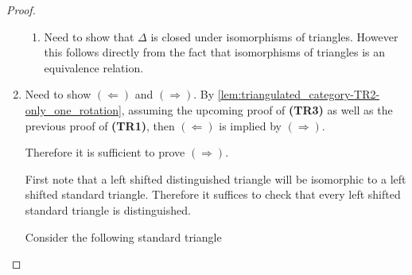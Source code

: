 \begin{proof}
\begin{enumerate}[label={(\bfseries TR\arabic*)}]
{\begin{enumerate}
{\begin{center}
                    \end{center}
                    However, it is a known fact the pushout of an isomorphism is an isomorphism. And so \( \gamma_{\Id} \) is an isomorphism, which implies \( C_{\Id} \cong 0 \) in \( \Mc \) because all injective modules are projective in \( \Mc \).
                }
                \item {
                    Need to show that \( \Delta \) is closed under isomorphisms of triangles. However this follows directly from the fact that isomorphisms of triangles is an equivalence relation.
                }
            \end{enumerate}
        }
        \item {
            Need to show \( (\Leftarrow) \) and \( (\Rightarrow) \). By \autoref{lem:triangulated_category-TR2-only_one_rotation}, assuming the upcoming proof of {\bf (TR3)} as well as the previous proof of {\bf (TR1)}, then \( (\Leftarrow) \) is implied by \( (\Rightarrow) \).
            
            Therefore it is sufficient to prove \( (\Rightarrow) \).

            First note that a left shifted distinguished triangle will be isomorphic to a left shifted standard triangle. Therefore it suffices to check that every left shifted standard triangle is distinguished.

            Consider the following standard triangle
            \begin{center}
            \end{center}

}
\end{enumerate}
\end{proof}
